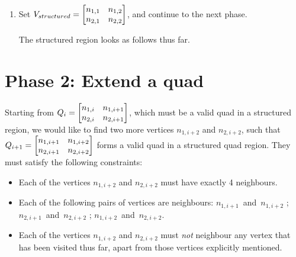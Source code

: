 \begin{enumerate}
\item Set $V_{structured} = \begin{bmatrix} n_{1,1} & n_{1,2} \\ n_{2,1} & n_{2,2} \end{bmatrix}$, and continue to the next phase.

The structured region looks as follows thus far.

\end{enumerate}









\section{Phase 2: Extend a quad}
Starting from $Q_i = \begin{bmatrix} n_{1,i} & n_{1,i+1} \\ n_{2,i} & n_{2,i+1} \end{bmatrix}$, which must be a valid quad in a structured region, we would like to find two more vertices $n_{1, i+2}$ and $n_{2,i+2}$, such that $Q_{i+1} = \begin{bmatrix} n_{1,i+1} & n_{1,i+2} \\ n_{2,i+1} & n_{2,i+2} \end{bmatrix}$ forms a valid quad in a structured quad region. They must satisfy the following constraints:

\begin{itemize}
\item Each of the vertices $n_{1, i+2}$ and $n_{2,i+2}$ must have exactly 4 neighbours.
\item Each of the following pairs of vertices are neighbours: $n_{1,i+1}$~and~$n_{1,i+2}$ ; $n_{2,i+1}$~and~$n_{2,i+2}$ ; $n_{1,i+2}$~and~$n_{2,i+2}$.
\item Each of the vertices $n_{1, i+2}$ and $n_{2,i+2}$ must \emph{not} neighbour any vertex that has been visited thus far, apart from those vertices explicitly mentioned.
\end{itemize}

